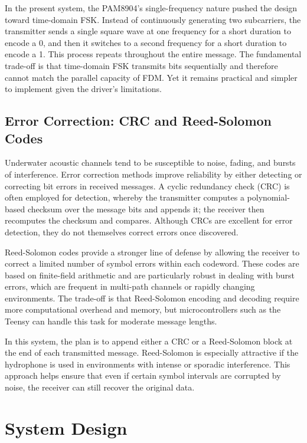 In the present system, the PAM8904's single-frequency nature pushed the design toward time-domain FSK. Instead of continuously generating two subcarriers, the transmitter sends a single square wave at one frequency for a short duration to encode a 0, and then it switches to a second frequency for a short duration to encode a 1. This process repeats throughout the entire message. The fundamental trade-off is that time-domain FSK transmits bits sequentially and therefore cannot match the parallel capacity of FDM. Yet it remains practical and simpler to implement given the driver's limitations.

\section{Error Correction: CRC and Reed-Solomon Codes}

Underwater acoustic channels tend to be susceptible to noise, fading, and bursts of interference. Error correction methods improve reliability by either detecting or correcting bit errors in received messages. A cyclic redundancy check (CRC) is often employed for detection, whereby the transmitter computes a polynomial-based checksum over the message bits and appends it; the receiver then recomputes the checksum and compares. Although CRCs are excellent for error detection, they do not themselves correct errors once discovered.

Reed-Solomon codes provide a stronger line of defense by allowing the receiver to correct a limited number of symbol errors within each codeword. These codes are based on finite-field arithmetic and are particularly robust in dealing with burst errors, which are frequent in multi-path channels or rapidly changing environments. The trade-off is that Reed-Solomon encoding and decoding require more computational overhead and memory, but microcontrollers such as the Teensy can handle this task for moderate message lengths. 

In this system, the plan is to append either a CRC or a Reed-Solomon block at the end of each transmitted message. Reed-Solomon is especially attractive if the hydrophone is used in environments with intense or sporadic interference. This approach helps ensure that even if certain symbol intervals are corrupted by noise, the receiver can still recover the original data.

\chapter{System Design}

